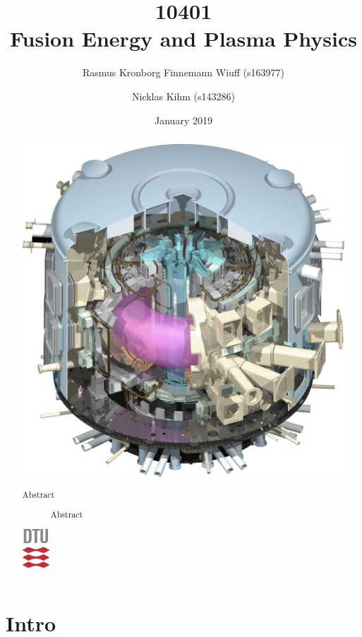 \documentclass[aps, prb, a4paper, english, 12pt, onecolumn, longbibliography, amsmath, amssymb, colorinlistoftodos, floatfix]{revtex4-1}
\begin{document}
\begin{abstract}
	\vspace{5mm}
	\centering
	\includegraphics[width=.5\textwidth]{Figures/ITERmachine.jpg}
	\begin{description}
		\item[Abstract] Abstract
	\end{description}
	\includegraphics[width=1cm]{Figures/DTU3CMYK.eps}
\end{abstract}

\title{10401\\Fusion Energy and Plasma Physics}
\date{January  2019}
\author{Rasmus Kronborg Finnemann Wiuff (s163977)}
\author{Nicklas Kihm (s143286)}
\maketitle


\tableofcontents

\makeatletter
\let\toc@pre\relax
\let\toc@post\relax
\makeatother

\thispagestyle{empty}
\setcounter{page}{1}

\section{Intro}

\end{document}
